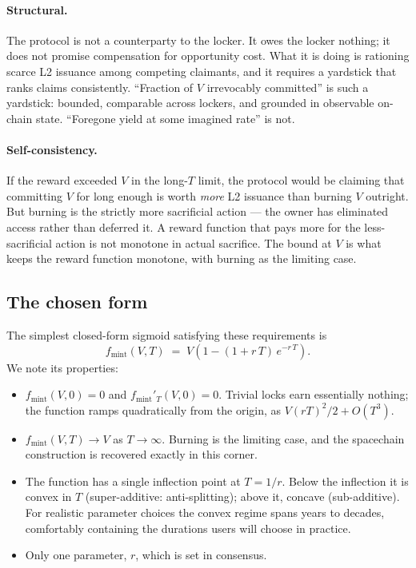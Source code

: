\documentclass[11pt,a4paper]{article}
\newcommand{\fmint}{f_{\mathrm{mint}}}
\begin{document}
\paragraph{Structural.} The protocol is not a counterparty to the locker. It owes the locker nothing; it does not promise compensation for opportunity cost. What it is doing is rationing scarce L2 issuance among competing claimants, and it requires a yardstick that ranks claims consistently. ``Fraction of $V$ irrevocably committed'' is such a yardstick: bounded, comparable across lockers, and grounded in observable on-chain state. ``Foregone yield at some imagined rate'' is not.

\paragraph{Self-consistency.} If the reward exceeded $V$ in the long-$T$ limit, the protocol would be claiming that committing $V$ for long enough is worth \emph{more} L2 issuance than burning $V$ outright. But burning is the strictly more sacrificial action --- the owner has eliminated access rather than deferred it. A reward function that pays more for the less-sacrificial action is not monotone in actual sacrifice. The bound at $V$ is what keeps the reward function monotone, with burning as the limiting case.

\subsection{The chosen form}

The simplest closed-form sigmoid satisfying these requirements is
\[
\fmint(V, T) \;=\; V\!\left(1 - (1 + r\,T)\,e^{-r\,T}\right).
\]
\noindent We note its properties:
\begin{itemize}[leftmargin=*]
  \item $\fmint(V, 0) = 0$ and ${\fmint}'_T(V, 0) = 0$. Trivial locks earn essentially nothing; the function ramps quadratically from the origin, as $V(rT)^2/2 + O(T^3)$.
  \item $\fmint(V, T) \to V$ as $T \to \infty$. Burning is the limiting case, and the spacechain construction is recovered exactly in this corner.
  \item The function has a single inflection point at $T = 1/r$. Below the inflection it is convex in $T$ (super-additive: anti-splitting); above it, concave (sub-additive). For realistic parameter choices the convex regime spans years to decades, comfortably containing the durations users will choose in practice.
  \item Only one parameter, $r$, which is set in consensus.
\end{itemize}
\end{document}
